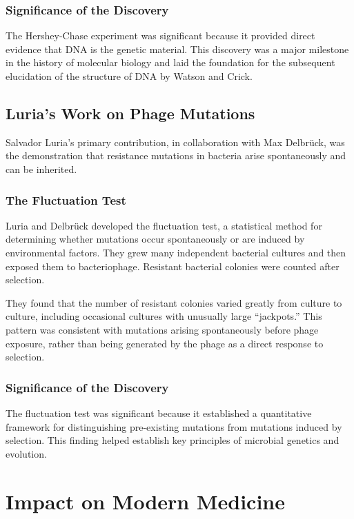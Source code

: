 \subsubsection{Significance of the Discovery}

The Hershey-Chase experiment was significant because it provided direct evidence that DNA is the genetic material. This discovery was a major milestone in the history of molecular biology and laid the foundation for the subsequent elucidation of the structure of DNA by Watson and Crick.

\subsection{Luria's Work on Phage Mutations}

Salvador Luria's primary contribution, in collaboration with Max Delbr\"uck, was the demonstration that resistance mutations in bacteria arise spontaneously and can be inherited.

\subsubsection{The Fluctuation Test}

Luria and Delbr\"uck developed the fluctuation test, a statistical method for determining whether mutations occur spontaneously or are induced by environmental factors. They grew many independent bacterial cultures and then exposed them to bacteriophage. Resistant bacterial colonies were counted after selection.

They found that the number of resistant colonies varied greatly from culture to culture, including occasional cultures with unusually large ``jackpots.'' This pattern was consistent with mutations arising spontaneously before phage exposure, rather than being generated by the phage as a direct response to selection.

\subsubsection{Significance of the Discovery}

The fluctuation test was significant because it established a quantitative framework for distinguishing pre-existing mutations from mutations induced by selection. This finding helped establish key principles of microbial genetics and evolution.

\section{Impact on Modern Medicine}

